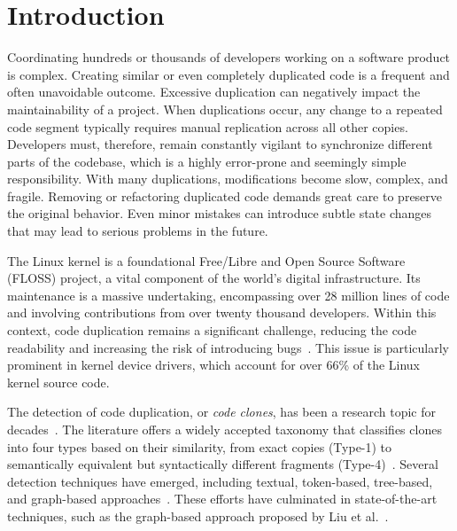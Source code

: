 \documentclass[10pt,conference]{IEEEtran}
\begin{document}

\IEEEpeerreviewmaketitle

\section{Introduction}
\label{sec:introduction}

Coordinating hundreds or thousands of developers working on a software product is complex. Creating similar or even completely duplicated code is a frequent and often unavoidable outcome. Excessive duplication can negatively impact the maintainability of a project. When duplications occur, any change to a repeated code segment typically requires manual replication across all other copies. Developers must, therefore, remain constantly vigilant to synchronize different parts of the codebase, which is a highly error-prone and seemingly simple responsibility. With many duplications, modifications become slow, complex, and fragile. Removing or refactoring duplicated code demands great care to preserve the original behavior. Even minor mistakes can introduce subtle state changes that may lead to serious problems in the future.

The Linux kernel is a foundational Free/Libre and Open Source Software (FLOSS) project, a vital component of the world's digital infrastructure. Its maintenance is a massive undertaking, encompassing over 28 million lines of code and involving contributions from over twenty thousand developers. Within this context, code duplication remains a significant challenge,  reducing the code readability and increasing the risk of introducing bugs~\cite{harmone,harmtwo}. This issue is particularly prominent in kernel device drivers, which account for over 66\% of the Linux kernel source code.

The detection of code duplication, or \textit{code clones}, has been a research topic for decades~\cite{firstman}. The literature offers a widely accepted taxonomy that classifies clones into four types based on their similarity, from exact copies (Type-1) to semantically equivalent but syntactically different fragments (Type-4)~\cite{litreview}. Several detection techniques have emerged, including textual, token-based, tree-based, and graph-based approaches~\cite{litreview}. These efforts have culminated in state-of-the-art techniques, such as the graph-based approach proposed by Liu et al.~\cite{tailor}.
\end{document}
